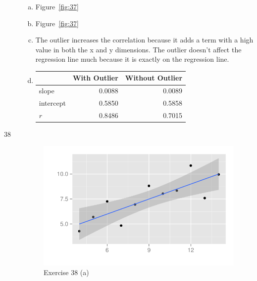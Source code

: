 \documentclass[letterpaper, landscape]{exam}
\begin{document}
\begin{description}
        \begin{enumerate}[(a)]
          \item Figure~\ref{fig:37}

          \item Figure~\ref{fig:37}

          \item
            The outlier increases the correlation because it adds a term
            with a high value in both the x and y dimensions.  The outlier
            doesn't affect the regression line much because it is exactly on the
            regression line.

          \item 
            \begin{tabular}[H]{lrr}
              \toprule
                        & With Outlier & Without Outlier \\
              \midrule
              slope     & 0.0088       & 0.0089 \\
              intercept & 0.5850       & 0.5858 \\
              $r$       & 0.8486       & 0.7015 \\
              \bottomrule
            \end{tabular}

        \end{enumerate}

      \item[38]
        \begin{figure}[H]
          \centering
          \includegraphics[scale = 0.9]{figures/ex38a.pdf}
          \caption{Exercise 38 (a)}\label{fig:38a}
        \end{figure}


\end{description}
\end{document}
